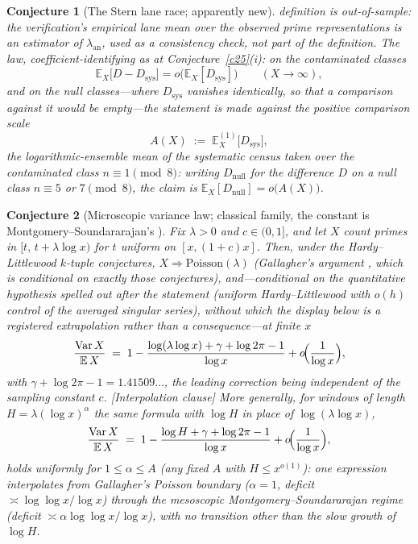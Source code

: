 \documentclass[11pt]{article}
\newtheorem{conjecture}{Conjecture}
\theoremstyle{definition}
\begin{document}
\begin{conjecture}[The Stern lane race; apparently new]
definition is out-of-sample: the verification's empirical lane mean
over the observed prime representations is an estimator of
$\lambda_{\mathrm{an}}$, used as a consistency check, not part of the
definition.  The law, coefficient-identifying as at
Conjecture~\ref{c25}(i): on the contaminated classes
\[
\mathbb E_X\bigl[D-D_{\mathrm{sys}}\bigr]
=o\bigl(\mathbb E_X[D_{\mathrm{sys}}]\bigr)
\qquad(X\to\infty),
\]
and on the null classes---where $D_{\mathrm{sys}}$ vanishes
identically, so that a comparison against it would be empty---the
statement is made against the positive comparison scale
\[
A(X)\;:=\;\mathbb E_X^{(1)}\bigl[D_{\mathrm{sys}}\bigr],
\]
the logarithmic-ensemble mean of the systematic census taken over the
\emph{contaminated} class $n\equiv1\pmod 8$: writing
$D_{\mathrm{null}}$ for the difference $D$ on a null class
$n\equiv5$ or $7\pmod 8$, the claim is
$\mathbb E_X[D_{\mathrm{null}}]=o\bigl(A(X)\bigr)$.
\end{conjecture}

\setcounter{conjecture}{12}%
\begin{conjecture}[Microscopic variance law; classical family, the
constant is Montgomery--Soundararajan's \cite{MS}]\label{c20}
Fix $\lambda>0$ and $c\in(0,1]$, and let $X$ count primes in
$[t,\,t+\lambda\log x)$ for $t$ uniform on $[x,(1+c)x]$.  Then, under
the Hardy--Littlewood $k$-tuple conjectures,
$X\Rightarrow\mathrm{Poisson}(\lambda)$ (Gallagher's argument
\cite{Gallagher}, which is conditional on exactly those conjectures),
and---\emph{conditional on the quantitative hypothesis} spelled out
after the statement (uniform Hardy--Littlewood with $o(h)$ control
of the averaged singular series), without which the display
below is a registered extrapolation rather than a consequence---at
finite $x$
\[
\frac{\operatorname{Var}X}{\mathbb E\,X}
\;=\;1-\frac{\log(\lambda\log x)+\gamma+\log2\pi-1}{\log x}
+o\!\Bigl(\frac1{\log x}\Bigr),
\]
with $\gamma+\log2\pi-1=1.41509\ldots$, the leading correction being
independent of the sampling constant $c$.  [Interpolation clause]
More generally, for windows of length $H=\lambda(\log x)^{\alpha}$
the \emph{same} formula with $\log H$ in place of
$\log(\lambda\log x)$,
\[
\frac{\operatorname{Var}X}{\mathbb E\,X}
\;=\;1-\frac{\log H+\gamma+\log2\pi-1}{\log x}
+o\!\Bigl(\frac1{\log x}\Bigr),
\]
holds uniformly for $1\le\alpha\le A$ (any fixed $A$ with
$H\le x^{o(1)}$): one expression interpolates from Gallagher's
Poisson boundary ($\alpha=1$, deficit $\asymp\log\log x/\log x$)
through the mesoscopic Montgomery--Soundararajan regime (deficit
$\asymp\alpha\log\log x/\log x$), with no transition other than the
slow growth of $\log H$.
\end{conjecture}
\end{document}
